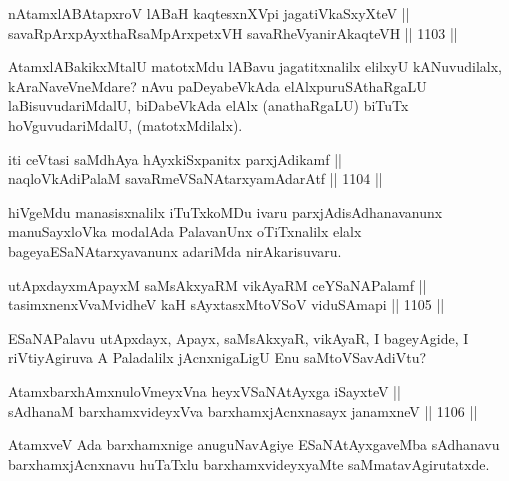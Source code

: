
\begin{shl}
nA\s \s tamxlABAtapxroV lABaH kaqtesxnXV\s pi jagatiVkaSxyXteV || \\
savaRpArxpAyxthaRsaMpArxpetxVH savaRheVyanirAkaqteVH \hfill || 1103 ||  
\end{shl}

\begin{artha}
AtamxlABakikxMtalU matotxMdu lABavu jagatitxnalilx elilxyU kANuvudilalx, kAraNaveVneMdare? nAvu paDeyabeVkAda elAlx\break puruSAthaRgaLU laBisuvudariMdalU, biDabeVkAda elAlx (anathaRgaLU) biTuTx hoVguvudariMdalU, (matotxMdilalx).
\end{artha}

\begin{shl}
iti ceVtasi saMdhAya hAyxkiSxpanitx parxjAdikamf || \\
naqloVkAdiPalaM savaRmeVSaNAtarxyamAdarAtf \hfill || 1104 ||  
\end{shl}

\begin{artha}
hiVgeMdu manasisxnalilx iTuTxkoMDu ivaru parxjAdisAdhanavanunx manuSayxloVka modalAda PalavanUnx oTiTxnalilx elalx bageya\break ESaNAtarxyavanunx adariMda nirAkarisuvaru.
\end{artha}


\begin{shl}
utApxdayxmApayxM saMsAkxyaRM vikAyaRM ceYSaNAPalamf || \\
tasimxnenxVvaMvidheV kaH sAyxtasxMtoVSoV viduSAmapi \hfill || 1105 ||  
\end{shl}

\begin{artha}
ESaNAPalavu utApxdayx, Apayx, saMsAkxyaR, vikAyaR, I bageyAgide, I riVtiyAgiruva A Paladalilx jAcnxnigaLigU Enu saMtoVSavAdiVtu?
\end{artha}


\begin{shl}
AtamxbarxhAmxnuloVmeyxVna heyxVSaNAtAyxga iSayxteV || \\
sAdhanaM barxhamxvideyxVva barxhamxjAcnxnasayx janamxneV \hfill || 1106 ||  
\end{shl}

\begin{artha}
AtamxveV Ada barxhamxnige anuguNavAgiye ESaNAtAyxgaveMba sAdhanavu barxhamxjAcnxnavu huTaTxlu barxhamxvideyxyaMte saMmatavAgirutatxde.
\end{artha}

